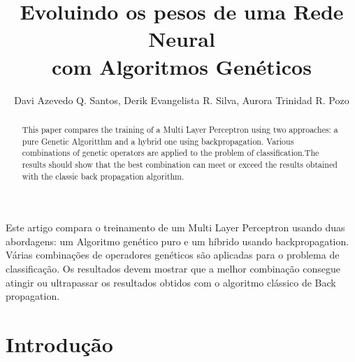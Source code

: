 \documentclass[12pt]{article}
\title{Evoluindo os pesos de uma Rede Neural \\com Algoritmos Genéticos}
\author{Davi Azevedo Q. Santos\inst{1}, Derik Evangelista R. Silva\inst{1}, Aurora Trinidad R. Pozo\inst{1}}
\begin{document}
 

\maketitle

\begin{abstract}
This paper compares the training of a Multi Layer Perceptron using two approaches: a pure Genetic Algoritthm and a hybrid one using backpropagation. Various combinations of genetic operators are applied to the problem of classification.The results should show that the best combination can meet or exceed the results obtained with the classic back propagation algorithm.
\end{abstract}
     
\begin{resumo} 
Este artigo compara o treinamento de um Multi Layer Perceptron usando duas abordagens: um Algoritmo 
genético puro e um híbrido usando backpropagation. Várias combinações de operadores genéticos são 
aplicadas para o problema de classificação. Os resultados devem mostrar que a melhor combinação consegue atingir ou ultrapassar os resultados obtidos com o algoritmo clássico de Back propagation.
\end{resumo}

\section{Introdução}
\end{document}
